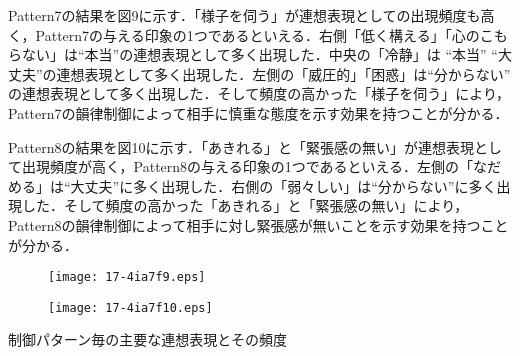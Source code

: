 \documentclass[japanese]{jnlp_1.4}
\begin{document}
Pattern7の結果を図9に示す．「様子を伺う」が連想表現としての出現頻度も高く，Pattern7の与える印象の1つであるといえる．右側「低く構える」「心のこもらない」は“本当”の連想表現として多く出現した．中央の「冷静」は “本当” “大丈夫”の連想表現として多く出現した．左側の「威圧的」「困惑」は“分からない” の連想表現として多く出現した．そして頻度の高かった「様子を伺う」により，Pattern7の韻律制御によって相手に慎重な態度を示す効果を持つことが分かる．

Pattern8の結果を図10に示す．「あきれる」と「緊張感の無い」が連想表現として出現頻度が高く，Pattern8の与える印象の1つであるといえる．左側の「なだめる」は“大丈夫”に多く出現した．右側の「弱々しい」は“分からない”に多く出現した．そして頻度の高かった「あきれる」と「緊張感の無い」により，Pattern8の韻律制御によって相手に対し緊張感が無いことを示す効果を持つことが分かる．


\begin{figure}[t]
\setlength{\captionwidth}{0.45\textwidth}
 \begin{minipage}{0.45\textwidth}
  \begin{center}
 \texttt{[image: 17-4ia7f9.eps]}
  \end{center}
  \label{fig:seven}
 \end{minipage}
\hfill
 \begin{minipage}{0.45\textwidth}
  \begin{center}
 \texttt{[image: 17-4ia7f10.eps]}
  \end{center}
  \label{fig:eight}
 \end{minipage}
\end{figure}

\begin{table}[t]
\caption{制御パターン毎の主要な連想表現とその頻度}

\end{table}
\end{document}

